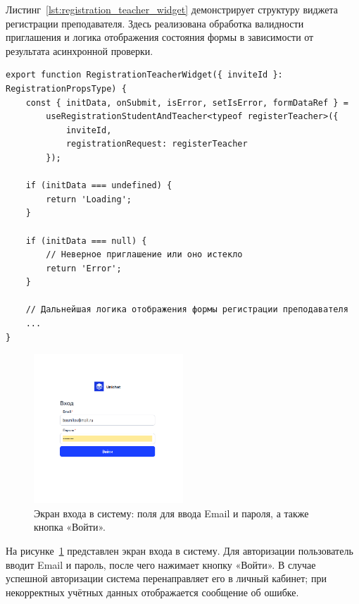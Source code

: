 Листинг~\ref{lst:registration_teacher_widget} демонстрирует структуру виджета регистрации преподавателя. Здесь реализована обработка валидности приглашения и логика отображения состояния формы в зависимости от результата асинхронной проверки.

\begin{lstlisting}[caption={Виджет регистрации преподавателя}, label={lst:registration_teacher_widget}]
export function RegistrationTeacherWidget({ inviteId }: RegistrationPropsType) {
    const { initData, onSubmit, isError, setIsError, formDataRef } =
        useRegistrationStudentAndTeacher<typeof registerTeacher>({
            inviteId,
            registrationRequest: registerTeacher
        });

    if (initData === undefined) {
        return 'Loading';
    }

    if (initData === null) {
        // Неверное приглашение или оно истекло
        return 'Error';
    }

    // Дальнейшая логика отображения формы регистрации преподавателя
    ...
}
\end{lstlisting}

\begin{figure}[H]
    \centering
    \includegraphics[width=0.5\textwidth]{static/presintation/LoginPage.png} %
    \caption{Экран входа в систему: поля для ввода Email и пароля, а также кнопка «Войти».}
    \label{fig:login_page}
\end{figure}

На рисунке~\ref{fig:login_page} представлен экран входа в систему. Для авторизации пользователь вводит Email и пароль, после чего нажимает кнопку «Войти». В случае успешной авторизации система перенаправляет его в личный кабинет; при некорректных учётных данных отображается сообщение об ошибке.

